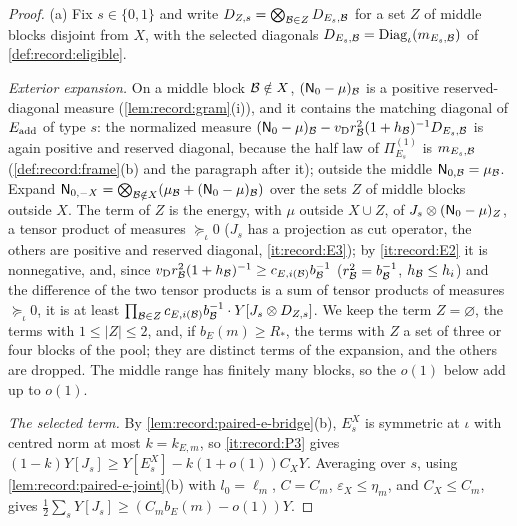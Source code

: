 \begin{proof}
(a) Fix $s\in\{0,1\}$ and write $D_{Z,s}=\bigotimes_{\mathcal B\in Z}D_{E_s,\mathcal B}$ for a
set $Z$ of middle blocks disjoint from $X$, with the selected diagonals
$D_{E_s,\mathcal B}=\operatorname{Diag}_\iota(m_{E_s,\mathcal B})$ of
\cref{def:record:eligible}.

\emph{Exterior expansion.} On a middle block $\mathcal B\notin X$, $(\mathsf N_0-\mu)_\mathcal B$ is a
positive reserved-diagonal measure (\cref{lem:record:gram}(i)), and it contains
the matching diagonal of $E_{\rm add}$ of type $s$: the normalized measure
$(\mathsf N_0-\mu)_\mathcal B-v_{\rm D}r_\mathcal B^2(1+h_\mathcal B)^{-1}D_{E_s,\mathcal B}$ is again positive
and reserved diagonal, because the half law of $\Pi^{(1)}_{E_s}$ is $m_{E_s,\mathcal B}$
(\cref{def:record:frame}(b) and the paragraph after it); outside the middle
$\mathsf N_{0,\mathcal B}=\mu_\mathcal B$. Expand $\mathsf N_{0,-X}=\bigotimes_{\mathcal B\notin X}(\mu_\mathcal B+(\mathsf N_0-\mu)_\mathcal B)$
over the sets $Z$ of middle blocks outside $X$. The term of $Z$ is the energy, with
$\mu$ outside $X\cup Z$, of $J_s\otimes(\mathsf N_0-\mu)_Z$, a tensor product of
measures $\succeq_\iota0$ ($J_s$ has a projection as cut operator, the others are
positive and reserved diagonal, \ref{it:record:E3}); by \ref{it:record:E2} it is
nonnegative, and, since $v_{\rm D}r_\mathcal B^2(1+h_\mathcal B)^{-1}\ge c_{E,i(\mathcal B)}b_\mathcal B^{-1}$
($r_\mathcal B^2=b_\mathcal B^{-1}$, $h_\mathcal B\le h_i$) and the difference of the two tensor
products is a sum of tensor products of measures $\succeq_\iota0$, it is at least
$\prod_{\mathcal B\in Z}c_{E,i(\mathcal B)}b_\mathcal B^{-1}\cdot Y[J_s\otimes D_{Z,s}]$. We keep the
term $Z=\varnothing$, the terms with $1\le|Z|\le2$, and, if $b_E(m)\ge R_*$, the
terms with $Z$ a set of three or four blocks of the pool; they are distinct terms
of the expansion, and the others are dropped. The middle range has finitely
many blocks, so the $o(1)$ below add up to $o(1)$.

\emph{The selected term.} By \cref{lem:record:paired-e-bridge}(b), $E^X_s$ is
symmetric at $\iota$ with centred norm at most $k=k_{E,m}$, so \ref{it:record:P3}
gives $(1-k)Y[J_s]\ge Y[E^X_s]-k(1+o(1))C_XY$. Averaging over $s$, using
\cref{lem:record:paired-e-joint}(b) with $l_0=\ell_m$, $C=C_m$, $\varepsilon_X\le\eta_m$,
and $C_X\le C_m$, gives $\frac12\sum_sY[J_s]\ge(C_mb_E(m)-o(1))Y$.


\end{proof}
